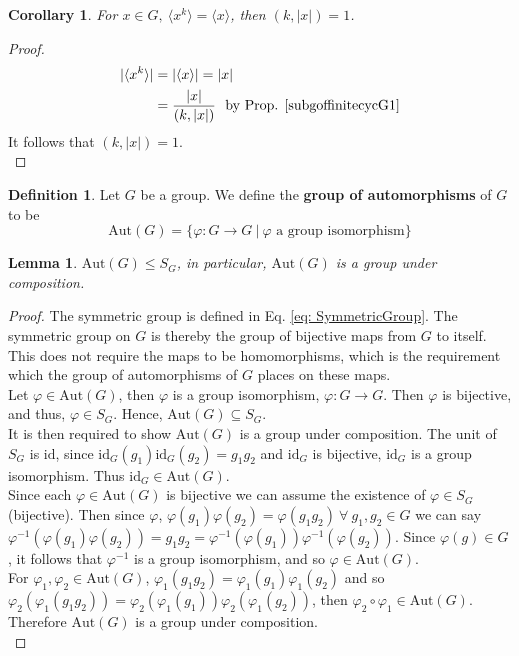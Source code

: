 \documentclass{article}
\newtheorem{corollary}{Corollary}[theorem]
\newtheorem{lemma}[theorem]{Lemma}
\theoremstyle{definition}
\newtheorem{definition}{Definition}[section]
\theoremstyle{remark}
\begin{document}
\begin{corollary}
For $x\in G,~\langle x^k\rangle =\langle x\rangle$, then $(k,|x|)=1$.\\
\end{corollary}
\begin{proof}
\begin{align*}
|\langle x^k\rangle|&=|\langle x\rangle|=|x|\\
								 &=\frac{|x|}{(k,|x|)}~\text{ by Prop. \ref{subgoffinitecycG1}}
\end{align*}
It follows that $(k,|x|)=1$.\\
\end{proof}
\begin{definition}
Let $G$ be a group. We define the \textbf{group of automorphisms} of $G$ to be 
\begin{equation}
\mathrm{Aut}(G)=\lbrace \varphi:G\rightarrow G~|~\varphi \text{ a group isomorphism}\rbrace
\end{equation}
\end{definition}
\begin{lemma}
$\mathrm{Aut}(G)\leq S_G$, in particular, $\mathrm{Aut}(G)$ is a group under composition.\\
\end{lemma}
\begin{proof}
The symmetric group is defined in Eq. \ref{eq: SymmetricGroup}. The symmetric group on $G$ is thereby the group of bijective maps from $G$ to itself. This does not require the maps to be homomorphisms, which is the requirement which the group of automorphisms of $G$ places on these maps.\\
\indent Let $\varphi\in\mathrm{Aut}(G)$, then $\varphi$ is a group isomorphism, $\varphi:G\rightarrow G$. Then $\varphi$ is bijective, and thus, $\varphi\in S_G$. Hence, $\mathrm{Aut}(G)\subseteq S_G$.\\
\indent It is then required to show $\mathrm{Aut}(G)$ is a group under composition. The unit of $S_G$ is $\mathrm{id}$, since $\mathrm{id}_G(g_1) \mathrm{id}_G(g_2)=g_1g_2$ and $\mathrm{id}_G$ is bijective, $\mathrm{id}_G$ is a group isomorphism. Thus $\mathrm{id}_G\in\mathrm{Aut}(G)$.\\
\indent Since each $\varphi\in\mathrm{Aut}(G)$ is bijective we can assume the existence of $\varphi\in S_G$ (bijective). Then since $\varphi$, $\varphi(g_1)\varphi(g_2)=\varphi(g_1g_2)~\forall~g_1,g_2\in G$ we can say $\varphi^{-1}(\varphi(g_1)\varphi(g_2))=g_1g_2=\varphi^{-1}(\varphi(g_1))\varphi^{-1}(\varphi(g_2))$. Since $\varphi(g)\in G$, it follows that $\varphi^{-1}$ is a group isomorphism, and so $\varphi\in\mathrm{Aut}(G)$.\\
\indent For $\varphi_1,\varphi_2\in\mathrm{Aut}(G)$, $\varphi_1(g_1g_2)=\varphi_1(g_1)\varphi_1(g_2)$ and so $\varphi_2(\varphi_1(g_1g_2))=\varphi_2(\varphi_1(g_1))\varphi_2(\varphi_1(g_2))$, then $\varphi_2\circ\varphi_1\in\mathrm{Aut}(G)$.\\
\indent Therefore $\mathrm{Aut}(G)$ is a group under composition.\\
\end{proof}
\end{document}
